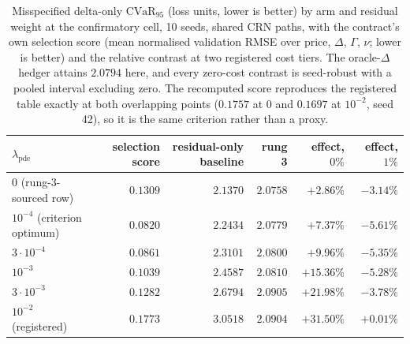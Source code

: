 \documentclass{article}
\begin{document}
\begin{table}[!htbp]
\caption{Misspecified delta-only $\mathrm{CVaR}_{95}$ (loss units, lower is better)
by arm and residual weight at the confirmatory cell, 10 seeds, shared CRN paths,
with the contract's own selection score (mean normalised validation RMSE over
price, $\Delta$, $\Gamma$, $\nu$; lower is better) and the relative contrast at two
registered cost tiers. The oracle-$\Delta$ hedger attains $2.0794$ here, and every
zero-cost contrast is seed-robust with a pooled interval excluding zero. The
recomputed score reproduces the registered table exactly at both overlapping points
($0.1757$ at $0$ and $0.1697$ at $10^{-2}$, seed 42), so it is the same criterion
rather than a proxy.}
\label{tab:lambda}
\centering\footnotesize\setlength{\tabcolsep}{5pt}
\begin{tabular}{@{}lrrrrr@{}}
\toprule
$\lambda_{\mathrm{pde}}$ & selection score & residual-only baseline & rung 3 & effect, $0\%$ & effect, $1\%$ \\
\midrule
$0$ (rung-3-sourced row) & $0.1309$ & $2.1370$ & $2.0758$ & $+2.86\%$ & $-3.14\%$ \\
$10^{-4}$ (criterion optimum) & $\mathbf{0.0820}$ & $2.2434$ & $2.0779$ & $+7.37\%$ & $-5.61\%$ \\
$3\cdot10^{-4}$ & $0.0861$ & $2.3101$ & $2.0800$ & $+9.96\%$ & $-5.35\%$ \\
$10^{-3}$ & $0.1039$ & $2.4587$ & $2.0810$ & $+15.36\%$ & $-5.28\%$ \\
$3\cdot10^{-3}$ & $0.1282$ & $2.6794$ & $2.0905$ & $+21.98\%$ & $-3.78\%$ \\
$10^{-2}$ (registered) & $0.1773$ & $3.0518$ & $2.0904$ & $+31.50\%$ & $+0.01\%$ \\
\bottomrule
\end{tabular}
\end{table}
\end{document}
